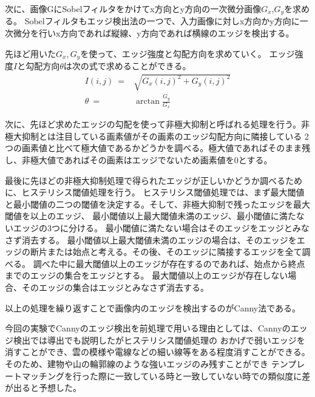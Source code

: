 \documentclass[titlepage,dvipdfmx]{jsarticle}
\begin{document}
次に、画像GにSobelフィルタをかけてx方向とy方向の一次微分画像$G_x$,$G_y$を求める。
Sobelフィルタもエッジ検出法の一つで、入力画像に対しx方向かy方向に一次微分を行いx方向であれば縦線、y方向であれば横線のエッジを検出する。

先ほど用いた$G_x,G_y$を使って、エッジ強度と勾配方向を求めていく。
エッジ強度$I$と勾配方向$\theta$は次の式で求めることができる。
\begin{align}
  I(i,j)\: =  & \sqrt{G_x(i,j)^2 + G_y(i,j)^2} \\
  \theta \: = & \arctan{\frac{G_y}{G_x}}
\end{align}

次に、先ほど求めたエッジの勾配を使って非極大抑制と呼ばれる処理を行う。非極大抑制とは注目している画素値がその画素のエッジ勾配方向に隣接している
2つの画素値と比べて極大値であるかどうかを調べる。極大値であればそのまま残し、非極大値であればその画素はエッジでないため画素値を0とする。

最後に先ほどの非極大抑制処理で得られたエッジが正しいかどうか調べるために、ヒステリシス閾値処理を行う。
ヒステリシス閾値処理では、まず最大閾値と最小閾値の二つの閾値を決定する。そして、非極大抑制で残ったエッジを最大閾値を以上のエッジ、
最小閾値以上最大閾値未満のエッジ、最小閾値に満たないエッジの3つに分ける。
最小閾値に満たない場合はそのエッジをエッジとみなさず消去する。
最小閾値以上最大閾値未満のエッジの場合は、そのエッジをエッジの断片または始点と考える。その後、そのエッジに隣接するエッジを全て調べる。
調べた中に最大閾値以上のエッジが存在するのであれば、始点から終点までのエッジの集合をエッジとする。
最大閾値以上のエッジが存在しない場合、そのエッジの集合はエッジとみなさず消去する。

以上の処理を繰り返すことで画像内のエッジを検出するのがCanny法である。\cite{f4}

今回の実験でCannyのエッジ検出を前処理で用いる理由としては、Cannyのエッジ検出では導出でも説明したがヒステリシス閾値処理の
おかげで弱いエッジを消すことができ、雲の模様や電線などの細い線等をある程度消すことができる。
そのため、建物や山の輪郭線のような強いエッジのみ残すことができ
テンプレートマッチングを行った際に一致している時と一致していない時での類似度に差が出ると予想した。
\end{document}
